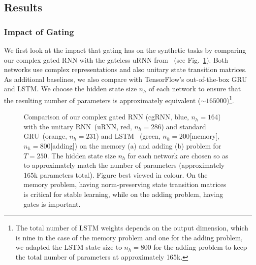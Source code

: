 \documentclass{article}
\begin{document}
\subsection{Results}

\subsubsection{Impact of Gating}
We first look at the impact that gating has on the synthetic tasks by comparing our complex gated RNN with the gateless uRNN from~\cite{Arjovsky} (see Fig.~\ref{fig:unnGRU}). Both networks use complex representations and also unitary state transition matrices. As additional baselines, we also compare with TensorFlow's out-of-the-box GRU and LSTM.  We choose the hidden state size $n_h$ of each network to ensure that the resulting number of parameters is approximately equivalent ($\sim 165000$)\footnote{The total number of LSTM weights depends on the output dimension, which is nine in the case of the memory problem and one for the adding problem, we adapted the LSTM state size to $n_h=800$ for the adding problem to keep the total number of parameters at approximately 165k.}.

\begin{figure}[t!]%
\centering
{}
\qquad
{}%
    \caption{\small Comparison of our complex gated RNN (cgRNN, blue, $n_h\!=\!164$) with the unitary RNN~\cite{Arjovsky}(uRNN, red, $n_h\!=\!286$) and standard GRU~\cite{cho-al-emnlp14}(orange, $n_h\!=\!231$) and LSTM~\cite{Hochreiter} (green, $n_h\!=\!200$[memory], $n_h\!=\!800$[adding]) on the memory (a) and adding (b) problem for $T\!=\!250$. The hidden state size $n_h$ for each network are chosen so as to approximately match the number of parameters (approximately 165k parameters total).  Figure best viewed in colour.  On the memory problem, having norm-preserving state transition matrices is critical for stable learning, while on the adding problem, having gates is important.}
    \label{fig:unnGRU}
    \vspace{-0.5cm}
\end{figure}
\end{document}
